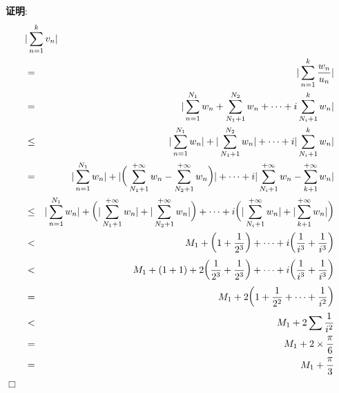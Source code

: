 \documentclass[a4paper,12pt,hyperref,twoside]{ctexart}
\numberwithin{equation}{section}
\newenvironment{proof}[1][\indent 证明]
    {\textbf {#1}:~}
    {\hfill $\Box$}
\begin{document}
\begin{proof}
\begin{eqnarray*}
\lefteqn{\vert\sum_{n=1}^{k}v_n\vert}\\
&=&\vert\sum_{n=1}^{k}\frac{w_n}{u_n}\vert\\
&=&\vert\sum_{n=1}^{N_1}{w_n}+\sum_{N_1+1}^{N_2}w_n +\dots+i\sum_{N_i+1}^{k}w_n\vert\\
&\le&\vert\sum_{n=1}^{N_1}w_n\vert +\vert\sum_{N_1+1}^{N_2}w_n\vert+\dots +i\vert\sum_{N_i+1}^{k}w_n\vert\\
&=&\vert\sum_{n=1}^{N_1}w_n\vert+\vert\bigg(\sum_{N_1+1}^{+\infty}w_n -\sum_{N_2+1}^{+\infty}w_n\bigg)\vert +\dots+i\vert\sum_{N_i+1}^{+\infty}w_n -\sum_{k+1}^{+\infty}w_n\vert\\
&\le&\vert\sum_{n=1}^{N_1}w_n\vert+ \bigg(\vert\sum_{N_1+1}^{+\infty}w_n\vert+\vert\sum_{N_2+1}^{+\infty}w_n \vert\bigg) +\dots+i\bigg(\vert\sum_{N_i+1}^{+\infty}w_n\vert +\vert\sum_{k+1}^{+\infty}w_n\vert\bigg)\\
&<& M_1+\bigg(1+\frac1{2^3}\bigg) +\dots+i\bigg(\frac1{i^3}+\frac1{i^3}\bigg)\\
&<& M_1+(1+1)+2\bigg(\frac1{2^3}+\frac1{2^3}\bigg) +\dots+i\bigg(\frac1{i^3}+\frac1{i^3}\bigg)\\
&=& M_1+2\bigg(1+\frac1{2^2}+\dots+\frac1{i^2}\bigg)\\
&<& M_1+2\sum\frac1{i^2}\\
&=& M_1+2\times\frac\pi6\\
&=& M_1+\frac\pi3
\end{eqnarray*}
\end{proof}
\end{document}
